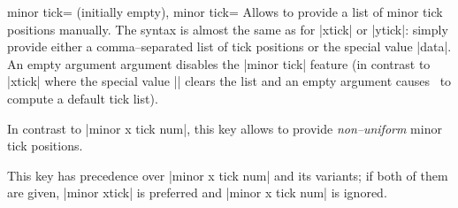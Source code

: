 \begin{pgfplotsxykeylist}{minor \x tick= (initially empty),%
	minor tick=}
	Allows to provide a list of minor tick positions manually. The syntax is almost the same as for |xtick| or |ytick|: simply provide either a comma--separated list of tick positions or the special value |data|. An empty argument argument disables the |minor tick| feature (in contrast to |xtick| where the special value |\empty| clears the list and an empty argument causes \PGFPlots\ to compute a default tick list).

	In contrast to |minor x tick num|, this key allows to provide \emph{non--uniform} minor tick positions.

\begin{codeexample}[]
\end{codeexample}

\begin{codeexample}[]
\end{codeexample}

	This key has precedence over |minor x tick num| and its variants; if both of them are given, |minor xtick| is preferred and |minor x tick num| is ignored.
\end{pgfplotsxykeylist}


